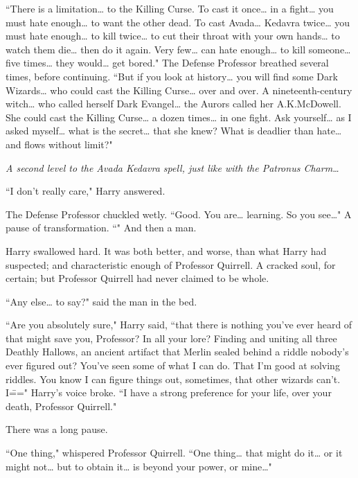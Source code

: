 ``There is a limitation{\ldots} to the Killing Curse. To cast it once{\ldots} in a fight{\ldots} you must hate enough{\ldots} to want the other dead. To cast Avada{\ldots} Kedavra twice{\ldots} you must hate enough{\ldots} to kill twice{\ldots} to cut their throat with your own hands{\ldots} to watch them die{\ldots} then do it again. Very few{\ldots} can hate enough{\ldots} to kill someone{\ldots} five times{\ldots} they would{\ldots} get bored." The Defense Professor breathed several times, before continuing. ``But if you look at history{\ldots} you will find some Dark Wizards{\ldots} who could cast the Killing Curse{\ldots} over and over. A nineteenth-century witch{\ldots} who called herself Dark Evangel{\ldots} the Aurors called her A.\?K.\?McDowell. She could cast the Killing Curse{\ldots} a dozen times{\ldots} in one fight. Ask yourself{\ldots} as I asked myself{\ldots} what is the secret{\ldots} that she knew? What is deadlier than hate{\ldots} and flows without limit?"

\emph{A second level to the Avada Kedavra spell, just like with the Patronus Charm{\ldots}}

``I don't really care," Harry answered.

The Defense Professor chuckled wetly. ``Good. You are{\ldots} learning. So you see{\ldots}" A pause of transformation. ``" And then a man.

Harry swallowed hard. It was both better, and worse, than what Harry had suspected; and characteristic enough of Professor Quirrell. A cracked soul, for certain; but Professor Quirrell had never claimed to be whole.

``Any else{\ldots} to say?" said the man in the bed.

``Are you absolutely sure," Harry said, ``that there is nothing you've ever heard of that might save you, Professor? In all your lore? Finding and uniting all three Deathly Hallows, an ancient artifact that Merlin sealed behind a riddle nobody's ever figured out? You've seen some of what I can do. That I'm good at solving riddles. You know I can figure things out, sometimes, that other wizards can't. I\===" Harry's voice broke. ``I have a strong preference for your life, over your death, Professor Quirrell."

There was a long pause.

``One thing," whispered Professor Quirrell. ``One thing{\ldots} that might do it{\ldots} or it might not{\ldots} but to obtain it{\ldots} is beyond your power, or mine{\ldots}"

